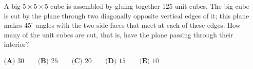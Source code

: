 A big $5\times5\times5$ cube is assembled by gluing together $125$ unit cubes. The big cube is cut by the plane through two diagonally opposite vertical edges of it; this plane makes $45^\circ$ angles with the two side faces that meet at each of these edges. How many of the unit cubes are cut, that is, have the plane passing through their interior?

$\textbf{(A) }30\qquad\textbf{(B) }25\qquad\textbf{(C) }20\qquad\textbf{(D) }15\qquad\textbf{(E) }10$
